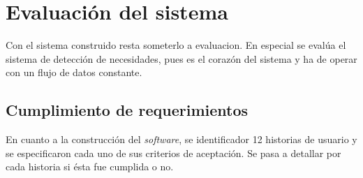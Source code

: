 \chapter{Evaluación del sistema}
\label{cap:experimentos}

Con el sistema construido resta someterlo a evaluacion. En especial se evalúa el sistema de detección de necesidades, pues es el corazón del sistema y ha de operar con un flujo de datos constante.

\section{Cumplimiento de requerimientos}
\label{seC:cumpRequerimientos}

En cuanto a la construcción del \textit{software}, se identificador 12 historias de usuario y se especificaron cada uno de sus criterios de aceptación. Se pasa a detallar por cada historia si ésta fue cumplida o no.

